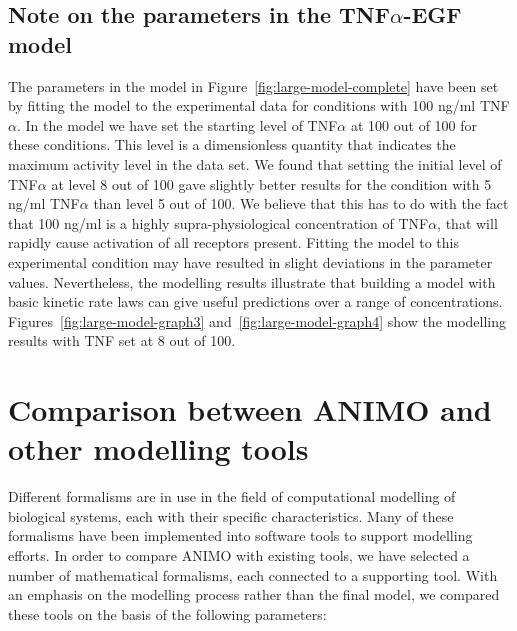\subsection{Note on the parameters in the TNF$\alpha$-EGF model}\label{suppl:parameters-tnf-egf}
The parameters in the model in Figure~\ref{fig:large-model-complete}
have been set by fitting the model to the experimental data for conditions with 100 ng/ml TNF$\alpha$.
In the model we have set the starting level of TNF$\alpha$ at 100 out of 100 for these conditions.
This level is a dimensionless quantity that indicates the maximum activity level in the data set.
We found that setting the initial level of TNF$\alpha$ at level 8 out of 100 gave slightly better results for the
condition with 5 ng/ml TNF$\alpha$ than level 5 out of 100. We believe that this has to do with the fact that
100 ng/ml is a highly supra-physiological concentration of TNF$\alpha$, that will rapidly cause activation of all
receptors present. Fitting the model to this experimental condition may have resulted in slight deviations
in the parameter values. Nevertheless, the modelling results illustrate that building a model with basic
kinetic rate laws can give useful predictions over a range of concentrations. Figures~\ref{fig:large-model-graph3} and~\ref{fig:large-model-graph4}
show the modelling results with TNF set at 8 out of 100.


\clearpage
\section{Comparison between ANIMO and other modelling tools}\label{suppl:comparison-table}
Different formalisms are in use in the field of computational
modelling of biological systems, each with their specific characteristics.
Many of these formalisms have been implemented into
software tools to support modelling efforts. In order to compare
ANIMO with existing tools, we have selected a number of mathematical formalisms,
each connected to a supporting tool. With an emphasis on the modelling
process rather than the final model, we compared these tools on
the basis of the following parameters:

